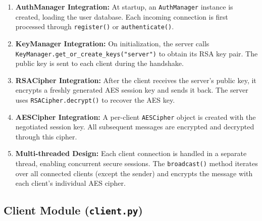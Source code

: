 \documentclass[12pt,a4paper]{article}
\begin{document}
\begin{enumerate}
    \item \textbf{AuthManager Integration:} At startup, an \texttt{AuthManager} instance is created, loading the user database. Each incoming connection is first processed through \texttt{register()} or \texttt{authenticate()}.
    
    \item \textbf{KeyManager Integration:} On initialization, the server calls \texttt{KeyManager.get\_or\_create\_keys("server")} to obtain its RSA key pair. The public key is sent to each client during the handshake.
    
    \item \textbf{RSACipher Integration:} After the client receives the server's public key, it encrypts a freshly generated AES session key and sends it back. The server uses \texttt{RSACipher.decrypt()} to recover the AES key.
    
    \item \textbf{AESCipher Integration:} A per-client \texttt{AESCipher} object is created with the negotiated session key. All subsequent messages are encrypted and decrypted through this cipher.
    
    \item \textbf{Multi-threaded Design:} Each client connection is handled in a separate thread, enabling concurrent secure sessions. The \texttt{broadcast()} method iterates over all connected clients (except the sender) and encrypts the message with each client's individual AES cipher.
\end{enumerate}

\subsection{Client Module (\texttt{client.py})}
\end{document}
